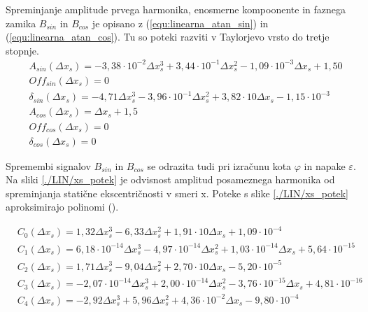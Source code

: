 Spreminjanje amplitude prvega harmonika, enosmerne kompoonente in faznega zamika $B_{sin}$ in $B_{cos}$ je opisano z (\ref{equ:linearna_atan_sin}) in (\ref{equ:linearna_atan_cos}). Tu so poteki razviti v Taylorjevo vrsto do tretje stopnje.
\begin{eqnarray}
\label{analog_lin_xs}
&A_{sin}(\Delta x_s) = -3,38\cdot 10^{-2}\Delta x_s^3+3,44\cdot 10^{-1}\Delta x_s^2-1,09\cdot 10^{-3}\Delta x_s+1,50 \\
&Off_{sin}(\Delta x_s) = 0 \\
&\delta_{sin}(\Delta x_s) = -4,71 \Delta x_s^3-3,96\cdot 10^{-1}\Delta x_s^2+3,82\cdot 10  \Delta x_s-1,15\cdot 10^{-3}  \\   
&A_{cos}(\Delta x_s) = \Delta x_s+1,5\\
&Off_{cos}(\Delta x_s) = 0 \\
&\delta_{cos}(\Delta x_s) = 0
\end{eqnarray}


\newpage
Spremembi signalov $B_{sin}$ in $B_{cos}$ se odrazita tudi pri izračunu kota $\varphi$ in napake $\varepsilon$.
Na sliki \ref{./LIN/xs_potek} je odvisnost amplitud posameznega harmonika od spreminjanja statične ekscentričnosti v smeri x. Poteke s slike \ref{./LIN/xs_potek} aproksimirajo polinomi (\label{nap_lin_xs}).

                             

\begin{eqnarray}
\label{nap_lin_xs}
&C_0(\Delta x_s) =1,32\Delta x_s^{3}-6,33\Delta x_s^{2}+1,91\cdot 10\Delta x_s+1,09\cdot 10^{-4} \\                                    
&C_1(\Delta x_s) =6,18\cdot 10^{-14}\Delta x_s^{3}-4,97\cdot 10^{-14}\Delta x_s^{2}+1,03\cdot 10^{-14}\Delta x_s+5,64\cdot 10^{-15} \\ 
&C_2(\Delta x_s) =1,71\Delta x_s^{3}-9,04\Delta x_s^{2}+2,70\cdot 10\Delta x_s-5,20\cdot 10^{-5} \\                                    
&C_3(\Delta x_s) =-2,07\cdot 10^{-14}\Delta x_s^{3}+2,00\cdot 10^{-14}\Delta x_s^{2}-3,76\cdot 10^{-15}\Delta x_s+4,81\cdot 10^{-16} \\
&C_4(\Delta x_s) =-2,92\Delta x_s^{3}+5,96\Delta x_s^{2}+4,36\cdot 10^{-2}\Delta x_s-9,80\cdot 10^{-4} \\ 
\end{eqnarray}

